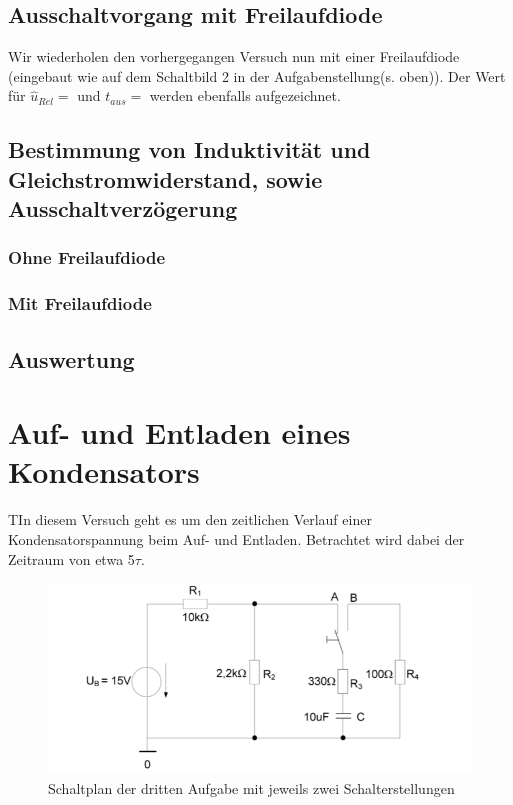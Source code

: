 \documentclass{article}
\begin{document}
\subsection{Ausschaltvorgang mit Freilaufdiode}

Wir wiederholen den vorhergegangen Versuch nun mit einer Freilaufdiode (eingebaut wie auf dem Schaltbild 2 in der Aufgabenstellung(s. oben)). Der Wert für $\hat{u}_{Rel} = $ und $t_{aus} = $ werden 
ebenfalls aufgezeichnet.

\subsection{Bestimmung von Induktivität und Gleichstromwiderstand, sowie Ausschaltverzögerung}
\subsubsection{Ohne Freilaufdiode}

\subsubsection{Mit Freilaufdiode}

\subsection{Auswertung}

\newpage

\section{Auf- und Entladen eines Kondensators}
\begin{task}
TIn diesem Versuch geht es um den zeitlichen Verlauf einer Kondensatorspannung beim Auf- und Entladen. Betrachtet wird dabei der Zeitraum von etwa 5$\tau$.
\end{task}
\begin{figure}[h]
    \begin{center}
        \includegraphics{../assets/images/ET2P4/Schaltplan3.PNG}
        \caption{Schaltplan der dritten Aufgabe mit jeweils zwei Schalterstellungen}
    \end{center}
\end{figure}
\end{document}
